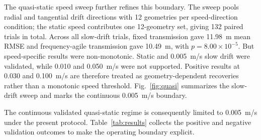 \documentclass[journal]{IEEEtran}
\begin{document}
The quasi-static speed sweep further refines this boundary. The sweep pools radial and tangential
drift directions with 12 geometries per speed-direction condition; the static speed contributes
one 12-geometry set, giving 132 paired trials in total. Across all slow-drift trials, fixed
transmission gave 11.98~m mean RMSE and frequency-agile transmission gave 10.49~m, with
$p=8.00\times 10^{-5}$. But speed-specific results were non-monotonic. Static and 0.005~m/s slow
drift were validated, while 0.010 and 0.050~m/s were not supported. Positive results at 0.030 and
0.100~m/s are therefore treated as geometry-dependent recoveries rather than a monotonic speed
threshold. Fig.~\ref{fig:quasi} summarizes the slow-drift sweep and marks the continuous
0.005~m/s boundary.

The continuous validated quasi-static regime is consequently limited to 0.005~m/s under the
present protocol. Table~\ref{tab:results} collects the positive and negative validation outcomes
to make the operating boundary explicit.
\end{document}
